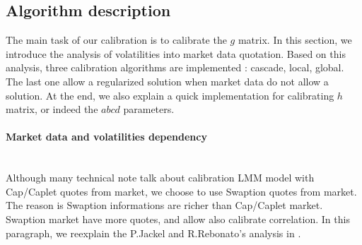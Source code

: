 \documentclass[a4paper,10pt]{article}
\begin{document}
\subsection{Algorithm description}
The main task of our calibration is to calibrate the $g$ matrix. In this section, we introduce the analysis of volatilities into market data quotation. Based on this analysis, three calibration algorithms are implemented : cascade, local, global. The last one allow a regularized solution when market data do not allow a solution. At the end, we also explain a quick implementation for calibrating $h$ matrix, or indeed the $abcd$ parameters.
\paragraph{Market data and volatilities dependency}\mbox{}\\
Although many technical note talk about calibration LMM model with Cap/Caplet quotes from market, we choose to use Swaption quotes from market. The reason is Swaption informations are richer than Cap/Caplet market. Swaption market have more quotes, and allow also calibrate correlation. In this paragraph, we reexplain the P.Jackel and R.Rebonato's analysis in \cite{JACKEL2003}. 
\end{document}
